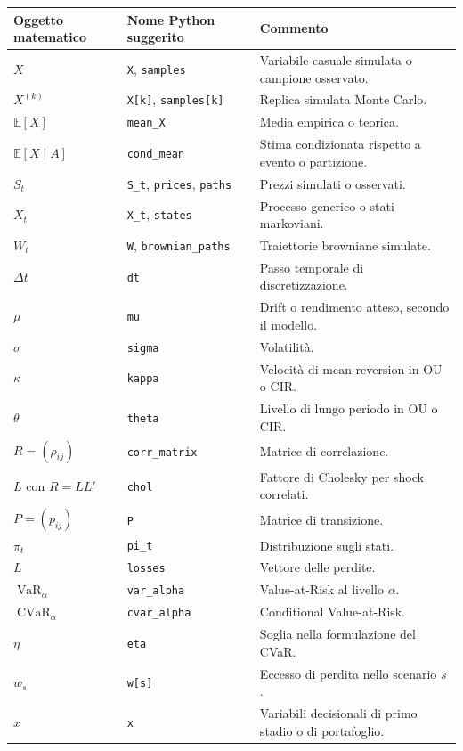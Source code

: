 \documentclass[12pt,a4paper]{article}
\newcommand{\E}{\mathbb{E}}
\newcommand{\1}{\mathbf{1}}
\newcommand{\VaR}{\operatorname{VaR}}
\newcommand{\CVaR}{\operatorname{CVaR}}
\begin{document}
\begin{longtable}{>{\raggedright}p{4.0cm}>{\raggedright}p{4.2cm}>{\raggedright\arraybackslash}p{5.8cm}}
\hline
\textbf{Oggetto matematico} & \textbf{Nome Python suggerito} & \textbf{Commento}\\
\hline
$X$ & \texttt{X}, \texttt{samples} & Variabile casuale simulata o campione osservato.\\
$X^{(k)}$ & \texttt{X[k]}, \texttt{samples[k]} & Replica simulata Monte Carlo.\\
$\E[X]$ & \texttt{mean\_X} & Media empirica o teorica.\\
$\E[X\mid A]$ & \texttt{cond\_mean} & Stima condizionata rispetto a evento o partizione.\\
$S_t$ & \texttt{S\_t}, \texttt{prices}, \texttt{paths} & Prezzi simulati o osservati.\\
$X_t$ & \texttt{X\_t}, \texttt{states} & Processo generico o stati markoviani.\\
$W_t$ & \texttt{W}, \texttt{brownian\_paths} & Traiettorie browniane simulate.\\
$\Delta t$ & \texttt{dt} & Passo temporale di discretizzazione.\\
$\mu$ & \texttt{mu} & Drift o rendimento atteso, secondo il modello.\\
$\sigma$ & \texttt{sigma} & Volatilit\`a.\\
$\kappa$ & \texttt{kappa} & Velocit\`a di mean-reversion in OU o CIR.\\
$\theta$ & \texttt{theta} & Livello di lungo periodo in OU o CIR.\\
$R=(\rho_{ij})$ & \texttt{corr\_matrix} & Matrice di correlazione.\\
$L$ con $R=LL'$ & \texttt{chol} & Fattore di Cholesky per shock correlati.\\
$P=(p_{ij})$ & \texttt{P} & Matrice di transizione.\\
$\pi_t$ & \texttt{pi\_t} & Distribuzione sugli stati.\\
$L$ & \texttt{losses} & Vettore delle perdite.\\
$\VaR_\alpha$ & \texttt{var\_alpha} & Value-at-Risk al livello $\alpha$.\\
$\CVaR_\alpha$ & \texttt{cvar\_alpha} & Conditional Value-at-Risk.\\
$\eta$ & \texttt{eta} & Soglia nella formulazione del CVaR.\\
$w_s$ & \texttt{w[s]} & Eccesso di perdita nello scenario $s$.\\
$x$ & \texttt{x} & Variabili decisionali di primo stadio o di portafoglio.\\

\end{longtable}
\end{document}
